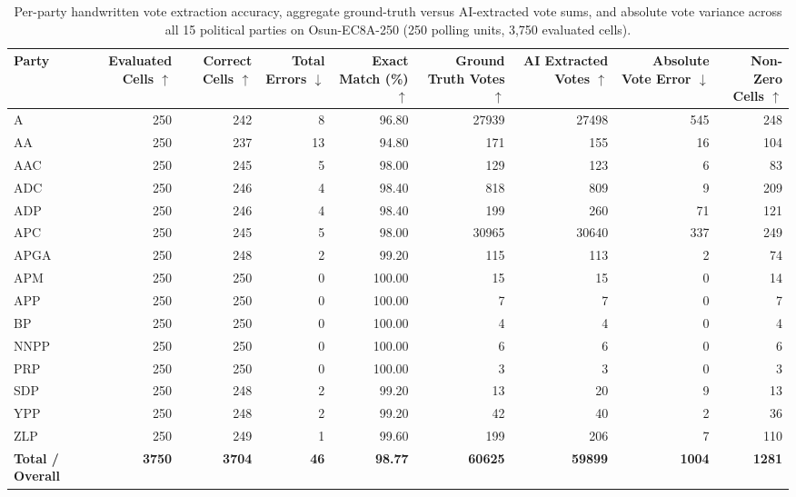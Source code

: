 \documentclass{article}
\begin{document}
\begin{table}[t]
\caption{Per-party handwritten vote extraction accuracy, aggregate ground-truth versus AI-extracted vote sums, and absolute vote variance across all 15 political parties on Osun-EC8A-250 (250 polling units, 3,750 evaluated cells).}
\label{tab:per_party}
\centering
\small
\begin{tabular}{lrrrrrrrr}
\toprule
Party & Evaluated Cells $\uparrow$ & Correct Cells $\uparrow$ & Total Errors $\downarrow$ & Exact Match (\%) $\uparrow$ & Ground Truth Votes $\uparrow$ & AI Extracted Votes $\uparrow$ & Absolute Vote Error $\downarrow$ & Non-Zero Cells $\uparrow$ \\
\midrule
A & 250 & 242 & 8 & 96.80 & 27939 & 27498 & 545 & 248 \\
AA & 250 & 237 & 13 & 94.80 & 171 & 155 & 16 & 104 \\
AAC & 250 & 245 & 5 & 98.00 & 129 & 123 & 6 & 83 \\
ADC & 250 & 246 & 4 & 98.40 & 818 & 809 & 9 & 209 \\
ADP & 250 & 246 & 4 & 98.40 & 199 & 260 & 71 & 121 \\
APC & 250 & 245 & 5 & 98.00 & 30965 & 30640 & 337 & 249 \\
APGA & 250 & 248 & 2 & 99.20 & 115 & 113 & 2 & 74 \\
APM & 250 & 250 & 0 & 100.00 & 15 & 15 & 0 & 14 \\
APP & 250 & 250 & 0 & 100.00 & 7 & 7 & 0 & 7 \\
BP & 250 & 250 & 0 & 100.00 & 4 & 4 & 0 & 4 \\
NNPP & 250 & 250 & 0 & 100.00 & 6 & 6 & 0 & 6 \\
PRP & 250 & 250 & 0 & 100.00 & 3 & 3 & 0 & 3 \\
SDP & 250 & 248 & 2 & 99.20 & 13 & 20 & 9 & 13 \\
YPP & 250 & 248 & 2 & 99.20 & 42 & 40 & 2 & 36 \\
ZLP & 250 & 249 & 1 & 99.60 & 199 & 206 & 7 & 110 \\
\midrule
\textbf{Total / Overall} & \textbf{3750} & \textbf{3704} & \textbf{46} & \textbf{98.77} & \textbf{60625} & \textbf{59899} & \textbf{1004} & \textbf{1281} \\
\bottomrule
\end{tabular}
\end{table}
\end{document}

